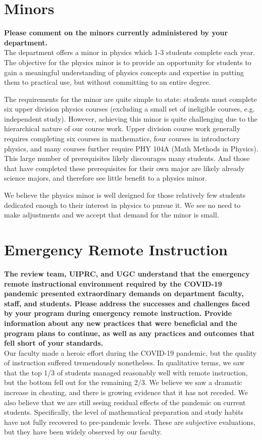 \documentclass[12pt]{article}
\begin{document}
\newpage	
\section{Minors}
{\bf Please comment on the minors currently administered by your
  department.}\\[3pt]

\noindent
The department offers a minor in physics which 1-3 students complete
each year.  The objective for the physics minor is to provide an
opportunity for students to gain a meaningful understanding of physics
concepts and expertise in putting them to practical use, but without
committing to an entire degree.

The requirements for the minor are quite simple to state: students
must complete six upper division physics courses (excluding a small
set of ineligible courses, e.g. independent study).  However,
achieving this minor is quite challenging due to the hierarchical
nature of our course work.  Upper division course work generally
requires completing six courses in mathematics, four courses in
introductory physics, and many courses further require PHY 104A (Math
Methods in Physics).  This large number of prerequisites likely
discourages many students.  And those that have completed these
prerequisites for their own major are likely already science majors,
and therefore see little benefit to a physics minor.

We believe the physics minor is well designed for those relatively few
students dedicated enough to their interest in physics to pursue it.  We see no need
to make adjustments and we accept that demand for the minor is small.

\newpage
\section{Emergency Remote Instruction}
\label{sec:remote}

{\bf The review team, UIPRC, and UGC understand that the emergency
  remote instructional environment required by the COVID-19 pandemic
  presented extraordinary demands on department faculty, staff, and
  students. Please address the successes and challenges faced by your
  program during emergency remote instruction. Provide information
  about any new practices that were beneficial and the program plans
  to continue, as well as any practices and outcomes that fell short
  of your standards.}\\[3pt]

\noindent
Our faculty made a heroic effort during the COVID-19 pandemic, but the
quality of instruction suffered tremendously nonetheless.  In
qualitative terms, we saw that the top 1/3 of students managed
reasonably well with remote instruction, but the bottom fell out for
the remaining 2/3.  We believe we saw a dramatic increase in cheating,
and there is growing evidence that it has not receded.  We also
believe that we are still seeing residual effects of the pandemic on
current students.  Specifically, the level of mathematical preparation
and study habits have not fully recovered to pre-pandemic levels.
These are subjective evaluations, but they have been widely observed
by our faculty.
\end{document}

